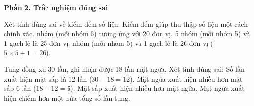 \textbf{Phần 2. Trắc nghiệm đúng sai}

\begin{ex} %
Xét tính đúng sai về kiểm đếm số liệu:
\choiceTF
{\True Kiểm đếm giúp thu thập số liệu một cách chính xác.}
{ nhóm (mỗi nhóm 5) tương ứng với 20 đơn vị.}
{5 nhóm (mỗi nhóm 5) và 1 gạch lẻ là 25 đơn vị.}
{ nhóm (mỗi nhóm 5) và 1 gạch lẻ là 26 đơn vị ($5 \times 5 + 1 = 26$).}
\end{ex}

\begin{ex} %
Tung đồng xu 30 lần, ghi nhận được 18 lần mặt ngửa. Xét tính đúng sai:
\choiceTF
{\True Số lần xuất hiện mặt sấp là 12 lần ($30 - 18 = 12$).}
{\True Mặt ngửa xuất hiện nhiều hơn mặt sấp 6 lần ($18 - 12 = 6$).}
{Mặt sấp xuất hiện nhiều hơn mặt ngửa.}
{\True Mặt ngửa xuất hiện chiếm hơn một nửa tổng số lần tung.}
\end{ex}

